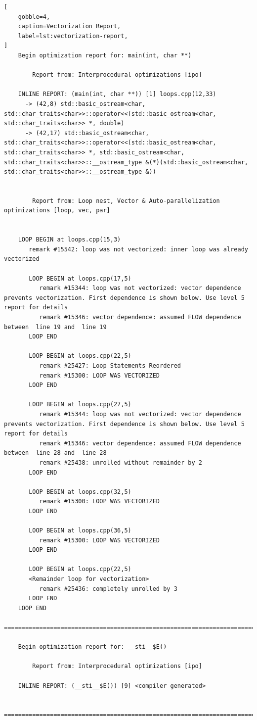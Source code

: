 \documentclass[
    12pt, %
]{fphw}
\begin{document}
\newpage
\begin{lstlisting}[
    gobble=4,
    caption=Vectorization Report,
    label=lst:vectorization-report,
]
    Begin optimization report for: main(int, char **)

        Report from: Interprocedural optimizations [ipo]

    INLINE REPORT: (main(int, char **)) [1] loops.cpp(12,33)
      -> (42,8) std::basic_ostream<char, std::char_traits<char>>::operator<<(std::basic_ostream<char, std::char_traits<char>> *, double)
      -> (42,17) std::basic_ostream<char, std::char_traits<char>>::operator<<(std::basic_ostream<char, std::char_traits<char>> *, std::basic_ostream<char, std::char_traits<char>>::__ostream_type &(*)(std::basic_ostream<char, std::char_traits<char>>::__ostream_type &))


        Report from: Loop nest, Vector & Auto-parallelization optimizations [loop, vec, par]


    LOOP BEGIN at loops.cpp(15,3)
       remark #15542: loop was not vectorized: inner loop was already vectorized

       LOOP BEGIN at loops.cpp(17,5)
          remark #15344: loop was not vectorized: vector dependence prevents vectorization. First dependence is shown below. Use level 5 report for details
          remark #15346: vector dependence: assumed FLOW dependence between  line 19 and  line 19
       LOOP END

       LOOP BEGIN at loops.cpp(22,5)
          remark #25427: Loop Statements Reordered
          remark #15300: LOOP WAS VECTORIZED
       LOOP END

       LOOP BEGIN at loops.cpp(27,5)
          remark #15344: loop was not vectorized: vector dependence prevents vectorization. First dependence is shown below. Use level 5 report for details
          remark #15346: vector dependence: assumed FLOW dependence between  line 28 and  line 28
          remark #25438: unrolled without remainder by 2  
       LOOP END

       LOOP BEGIN at loops.cpp(32,5)
          remark #15300: LOOP WAS VECTORIZED
       LOOP END

       LOOP BEGIN at loops.cpp(36,5)
          remark #15300: LOOP WAS VECTORIZED
       LOOP END

       LOOP BEGIN at loops.cpp(22,5)
       <Remainder loop for vectorization>
          remark #25436: completely unrolled by 3  
       LOOP END
    LOOP END
    ===========================================================================

    Begin optimization report for: __sti__$E()

        Report from: Interprocedural optimizations [ipo]

    INLINE REPORT: (__sti__$E()) [9] <compiler generated>

    ===========================================================================
\end{lstlisting}
\end{document}
